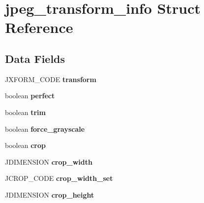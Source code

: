 \hypertarget{structjpeg__transform__info}{}\section{jpeg\+\_\+transform\+\_\+info Struct Reference}
\label{structjpeg__transform__info}
\subsection*{Data Fields}
\begin{DoxyCompactItemize}
\item 
\mbox{\label{structjpeg__transform__info_ac202dc98f85a345f54f0514619de1393}} 
J\+X\+F\+O\+R\+M\+\_\+\+C\+O\+DE {\bfseries transform}
\item 
\mbox{\label{structjpeg__transform__info_a942151ba3dcab95e8e5351a3835178f6}} 
boolean {\bfseries perfect}
\item 
\mbox{\label{structjpeg__transform__info_a941b4b3ce1b00159c3a5143a1974d973}} 
boolean {\bfseries trim}
\item 
\mbox{\label{structjpeg__transform__info_ac6305e19eebbbed9b067a06c68268b66}} 
boolean {\bfseries force\+\_\+grayscale}
\item 
\mbox{\label{structjpeg__transform__info_ae1d2f17df9344841f30c3b8870c6634e}} 
boolean {\bfseries crop}
\item 
\mbox{\label{structjpeg__transform__info_a41a188ebd1ac50c77418e986f269065d}} 
J\+D\+I\+M\+E\+N\+S\+I\+ON {\bfseries crop\+\_\+width}
\item 
\mbox{\label{structjpeg__transform__info_aea34eef78de39af5f48872b5b171d79a}} 
J\+C\+R\+O\+P\+\_\+\+C\+O\+DE {\bfseries crop\+\_\+width\+\_\+set}
\item 
\mbox{\label{structjpeg__transform__info_a88b9c5f968b3ec7885a0edb7a42e6b0b}} 
J\+D\+I\+M\+E\+N\+S\+I\+ON {\bfseries crop\+\_\+height}
\item 

\end{DoxyCompactItemize}
